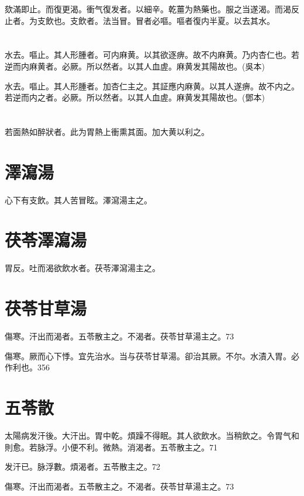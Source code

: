 \documentclass[12pt,twoside,UTF8,b5paper]{ctexbook}
\begin{document}
欬滿即止。而復更渴。衝气復发者。以細辛。乾薑为熱藥也。服之当遂渴。而渴反止者。为支飲也。支飲者。法当冒。冒者必嘔。嘔者復内半夏。以去其水。

\section{}

水去。嘔止。其人形腫者。可内麻黄。以其欲逐痹。故不内麻黄。乃内杏仁也。若逆而内麻黄者。必厥。所以然者。以其人血虗。麻黄发其陽故也。(吳本)

水去。嘔止。其人形腫者。加杏仁主之。其証應内麻黄。以其人遂痹。故不内之。若逆而内之者。必厥。所以然者。以其人血虗。麻黄发其陽故也。(鄧本)

\section{}

若面熱如醉{狀者}。此为胃熱上衝熏其面。加大黄以利之。

\section{澤瀉湯}

心下有支飲。其人苦冒眩。澤瀉湯主之。

\section{茯苓澤瀉湯}

胃反。吐而渴欲飲水者。茯苓澤瀉湯主之。

\section{茯苓甘草湯}

傷寒。汗出而渴者。五苓散主之。不渴者。茯苓甘草湯主之。73

傷寒。厥而心下悸。宜先治水。当与茯苓甘草湯。卻治其厥。不尔。水漬入胃。必作利也。356

\section{五苓散}

太陽病发汗後。大汗出。胃中乾。煩躁不得眠。其人欲飲水。当稍飲之。令胃气和則愈。若脉浮。小便不利。微熱。消渴者。五苓散主之。71

发汗已。脉浮數。煩渴者。五苓散主之。72

傷寒。汗出而渴者。五苓散主之。不渴者。茯苓甘草湯主之。73
\end{document}
